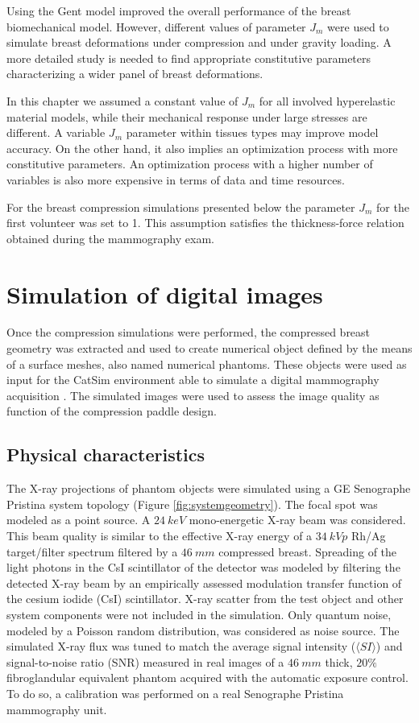 Using the Gent model improved the overall performance of the breast biomechanical model. However, different values of  parameter $J_m$ were used to simulate breast deformations under compression and under gravity loading. A more detailed study is needed to find appropriate constitutive parameters characterizing a wider panel of breast deformations.  

 In this chapter we assumed a constant value of $J_m$ for all involved hyperelastic material models, while their mechanical response under large stresses are different. A variable $J_m$ parameter within tissues types may improve model accuracy.  On the other hand, it also implies an optimization process with more constitutive parameters. An optimization process with a higher number of variables is also more expensive in terms of data and time resources. 
 
 For the breast compression simulations presented below the parameter $J_m$ for the first volunteer was set to 1. This assumption satisfies the thickness-force  relation obtained during the mammography exam.

\section{Simulation of digital images }
Once the compression simulations were performed, the compressed breast geometry was extracted and used to create numerical object defined by the means of a surface meshes, also named numerical phantoms. These objects were used as input for the CatSim environment able to simulate a digital mammography  acquisition \citep{de_low_2014,de_catsim_2007}. The simulated images were used to assess the image quality as function of the compression paddle design.

\subsection{Physical characteristics}
The X-ray projections of phantom objects were simulated using a GE Senographe Pristina system topology (Figure \ref{fig:systemgeometry}). The focal spot was modeled as a point source. A $24\ keV$ mono-energetic X-ray beam was considered.  This beam quality is similar to the effective X-ray energy of a $34\ kVp$ Rh/Ag target/filter spectrum filtered by a $46\ mm$ compressed breast. Spreading of the light photons in the CsI scintillator of the detector was modeled by filtering the detected X-ray beam by an empirically assessed modulation transfer function of the cesium iodide (CsI) scintillator. X-ray scatter from the test object and other system components were not included in the simulation. Only quantum noise, modeled by a Poisson random distribution, was considered as noise source. The simulated X-ray flux was tuned to match the average signal intensity ($\langle SI \rangle$) and signal-to-noise ratio (SNR) measured in real images of a $46\ mm$ thick, $20\%$ fibroglandular equivalent phantom acquired with the automatic exposure control. To do so, a calibration was performed on a real Senographe Pristina mammography unit.


